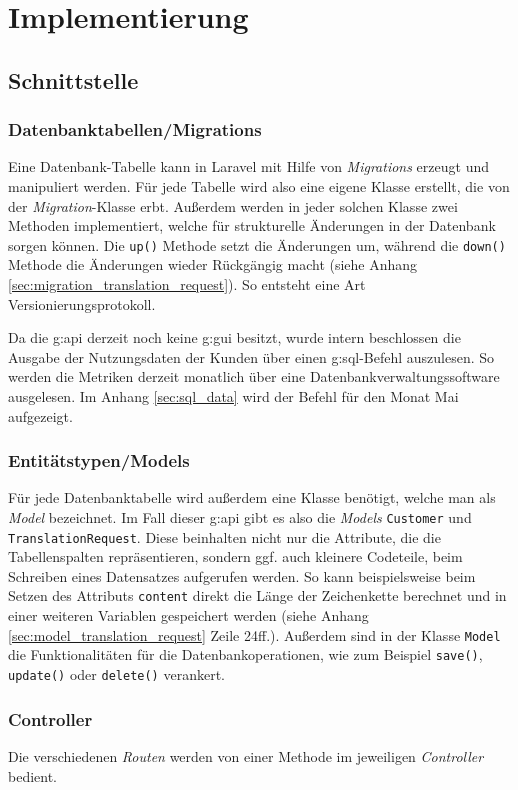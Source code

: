 \section{Implementierung}
\subsection{Schnittstelle}
\subsubsection{Datenbanktabellen/Migrations}
Eine Datenbank-Tabelle kann in Laravel mit Hilfe von \emph{Migrations} erzeugt und manipuliert werden. 
Für jede Tabelle wird also eine eigene Klasse erstellt, die von der \emph{Migration}-Klasse erbt.
Außerdem werden in jeder solchen Klasse zwei Methoden implementiert, welche für strukturelle Änderungen in der Datenbank sorgen können. 
Die \texttt{up()} Methode setzt die Änderungen um, während die \texttt{down()} Methode die Änderungen wieder Rückgängig macht (siehe Anhang \ref{sec:migration_translation_request}).
So entsteht eine Art Versionierungsprotokoll.

Da die \gls{g:api} derzeit noch keine \gls{g:gui} besitzt, wurde intern beschlossen die Ausgabe der Nutzungsdaten der Kunden über einen \gls{g:sql}-Befehl auszulesen. 
So werden die Metriken derzeit monatlich über eine Datenbankverwaltungssoftware ausgelesen. 
Im Anhang \ref{sec:sql_data} wird der Befehl für den Monat Mai aufgezeigt.

\subsubsection{Entitätstypen/Models}
Für jede Datenbanktabelle wird außerdem eine Klasse benötigt, welche man als \emph{Model} bezeichnet.
Im Fall dieser \gls{g:api} gibt es also die \emph{Models} \texttt{Customer} und \texttt{TranslationRequest}.
Diese beinhalten nicht nur die Attribute, die die Tabellenspalten repräsentieren, sondern ggf. auch kleinere Codeteile, beim Schreiben eines Datensatzes aufgerufen werden.
So kann beispielsweise beim Setzen des Attributs \texttt{content} direkt die Länge der Zeichenkette berechnet und in einer weiteren Variablen gespeichert werden (siehe Anhang \ref{sec:model_translation_request} Zeile 24ff.).
Außerdem sind in der Klasse \texttt{Model} die Funktionalitäten für die Datenbankoperationen, wie zum Beispiel \texttt{save()}, \texttt{update()} oder \texttt{delete()} verankert.

\subsubsection{Controller}
Die verschiedenen \emph{Routen} werden von einer Methode im jeweiligen \emph{Controller} bedient. 

